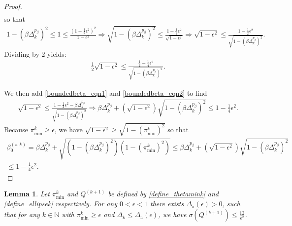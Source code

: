 \documentclass{article}
\newtheorem{lemma}[theorem]{Lemma}
\theoremstyle{case}
\numberwithin{theorem}{subsection}
\newcommand{\bsk}{{\beta_0^{(\star, k)}}}
\newcommand{\dacco}{{\Delta_{\textrm{a}}}}
\newcommand{\dk}{\Delta_k}
\newcommand{\naturals}{\mathbb N}
\newcommand{\thetamink}{{\pi^k_{\textrm{min}}}}
\newcommand{\qkpo}{{Q^{(k+1)}}}
\begin{document}
\begin{proof}
\begin{align*}
\end{align*}
so that
\begin{align*}
1 - \left(\beta\dk^{p_{\beta}}\right)^2 \le 1 \le \frac{\left(1 - \frac 1 2 \epsilon^2\right)^2}{1 - \epsilon^2} 
\Longrightarrow \sqrt{1 - \left(\beta\dk^{p_{\beta}}\right)^2}\le \frac{1 - \frac 1 2 \epsilon^2}{\sqrt{1 - \epsilon^2} } 
\Longrightarrow \sqrt{1 - \epsilon^2} \le \frac{1 - \frac 1 2 \epsilon^2}{\sqrt{1 - \left(\beta\dk^{p_{\beta}}\right)^2}}.
\end{align*}
Dividing by $2$ yields:
\begin{align}
\frac 1 2 \sqrt{1 - \epsilon^2} \le \frac{\frac 1 2 - \frac 1 4 \epsilon^2}{\sqrt{1 - \left(\beta\dk^{p_{\beta}}\right)^2}}
\label{boundedbeta_eqn2}.
\end{align}

We then add \cref{boundedbeta_eqn1} and \cref{boundedbeta_eqn2} to find
\begin{align*}
\sqrt{1 - \epsilon^2} \le \frac{1 -  \frac 1 4 \epsilon^2 - \beta\dk^{p_{\beta}}}{\sqrt{1 - \left(\beta\dk^{p_{\beta}}\right)^2}}
\Longrightarrow \beta\dk^{p_{\beta}} + \left(\sqrt{1 - \epsilon^2}\right)\sqrt{1 - \left(\beta\dk^{p_{\beta}}\right)^2} \le 1 -  \frac 1 4 \epsilon^2.
\end{align*}
Because $\thetamink \ge \epsilon$, we have $\sqrt{1 - \epsilon^2} \ge \sqrt{1 - \left(\thetamink\right)^2}$
so that
\begin{align*}
\bsk 
= \beta\dk^{p_{\beta}} + \sqrt{\left(1 - \left(\beta\dk^{p_{\beta}}\right)^2\right)\left(1 - \left(\thetamink\right)^2\right)} 
\le \beta\dk^{p_{\beta}} + \left(\sqrt{1 - \epsilon^2}\right)\sqrt{1 - \left(\beta\dk^{p_{\beta}}\right)^2} \\
\le 1 -  \frac 1 4 \epsilon^2.
\end{align*}
\end{proof}



\begin{lemma}
\label{boundbeta}
Let $\thetamink$ and $\qkpo$ be defined by \cref{define_thetamink} and \cref{define_ellipsek} respectively.
For any $0 < \epsilon < 1$ there exists $\dacco(\epsilon) > 0$, such that for any $k \in \naturals$ with
$\thetamink \ge \epsilon$ and $\dk \le \dacco(\epsilon)$, we have $\sigma(\qkpo) \le \frac{12}{\epsilon^2}$.
\end{lemma}
\end{document}
